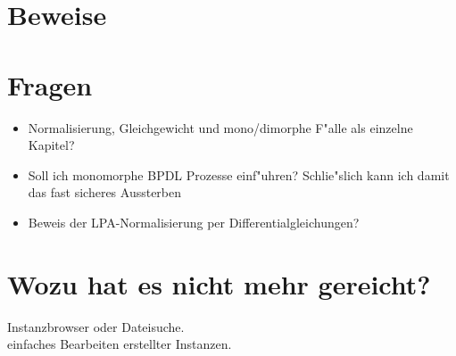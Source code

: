 \documentclass[11pt, a4paper, german]{article}
\begin{document}
\clearpage


\clearpage

\section{Beweise}


\section{Fragen}
\begin{itemize}
	\item Normalisierung, Gleichgewicht und mono/dimorphe F"alle als einzelne Kapitel?
	\item Soll ich monomorphe BPDL Prozesse einf"uhren? Schlie"slich kann ich damit das fast sicheres Aussterben 
	\item Beweis der LPA-Normalisierung per Differentialgleichungen?
\end{itemize}

\section{Wozu hat es nicht mehr gereicht?}
Instanzbrowser oder Dateisuche.\\
einfaches Bearbeiten erstellter Instanzen.\\
\end{document}
